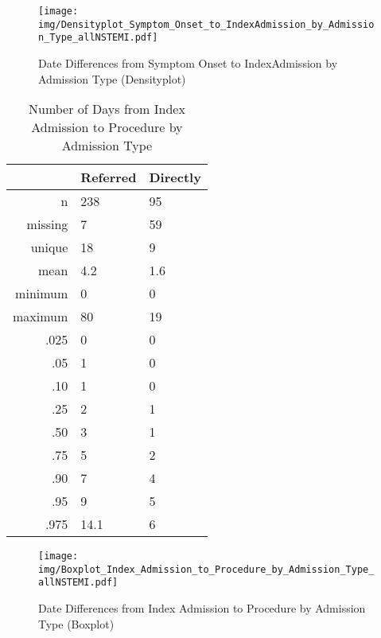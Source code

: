 \documentclass[presentation,xcolor=pdftex,dvipsnames,table,11pt]{beamer}
\begin{document}
\begin{tiny}
\begin{frame}
\begin{figure}
  \centering
  \caption{Date Differences from Symptom Onset to IndexAdmission by Admission Type (Densityplot)}
  \label{Density: Date Differences from Symptom Onset to IndexAdmission by Admission Type}
\texttt{[image: img/Densityplot\_Symptom\_Onset\_to\_IndexAdmission\_by\_Admission\_Type\_allNSTEMI.pdf]}\end{figure}
\end{frame}



\begin{frame}
\begin{table}[ht]
\centering
\begin{tabular}{rll}
  \toprule
 & Referred & Directly \\ 
  \midrule
n & 238 & 95 \\ 
  missing & 7 & 59 \\ 
  unique & 18 & 9 \\ 
  mean & 4.2 & 1.6 \\ 
  minimum & 0 & 0 \\ 
  maximum & 80 & 19 \\ 
  .025 & 0 & 0 \\ 
  .05 & 1 & 0 \\ 
  .10 & 1 & 0 \\ 
  .25 & 2 & 1 \\ 
  .50 & 3 & 1 \\ 
  .75 & 5 & 2 \\ 
  .90 & 7 & 4 \\ 
  .95 & 9 & 5 \\ 
  .975 & 14.1 & 6 \\ 
   \bottomrule
\end{tabular}
\caption{Number of Days from Index Admission to Procedure by Admission Type} 
\end{table}\end{frame}

\begin{frame}
\begin{figure}
  \centering
  \caption{Date Differences from Index Admission to Procedure by Admission Type (Boxplot)}
  \label{Boxplot: Date Differences from Index Admission to Procedure by Admission Type}
\texttt{[image: img/Boxplot\_Index\_Admission\_to\_Procedure\_by\_Admission\_Type\_allNSTEMI.pdf]}\end{figure}
\end{frame}



\end{tiny}
\end{document}
